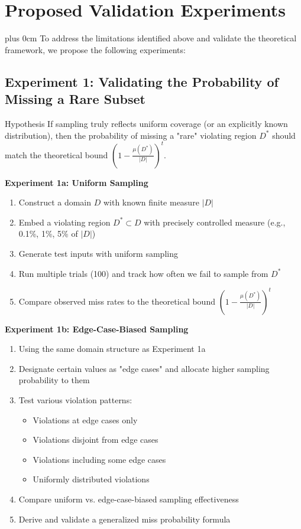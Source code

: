\documentclass[conference]{IEEEtran}
\newcommand{\justifytext}{\leftskip=0pt \rightskip=0pt plus 0cm}
\begin{document}
\section{Proposed Validation Experiments}

\justifytext
To address the limitations identified above and validate the theoretical framework, we propose the following experiments:

\subsection{Experiment 1: Validating the Probability of Missing a Rare Subset}

\begin{theorembox}{Hypothesis}
If sampling truly reflects uniform coverage (or an explicitly known distribution), then the probability of missing a "rare" violating region $D^*$ should match the theoretical bound $\left(1 - \frac{\mu(D^*)}{|D|}\right)^t$.
\end{theorembox}

\begin{tcolorbox}[
  colback=blue!5!white,
  colframe=blue!75!black,
  title=Experimental Design,
  fonttitle=\bfseries
]

\textbf{Experiment 1a: Uniform Sampling}
\begin{enumerate}
\item Construct a domain $D$ with known finite measure $|D|$
\item Embed a violating region $D^* \subset D$ with precisely controlled measure (e.g., 0.1\%, 1\%, 5\% of $|D|$)
\item Generate test inputs with uniform sampling
\item Run multiple trials (100) and track how often we fail to sample from $D^*$
\item Compare observed miss rates to the theoretical bound $\left(1 - \frac{\mu(D^*)}{|D|}\right)^t$
\end{enumerate}

\textbf{Experiment 1b: Edge-Case-Biased Sampling}
\begin{enumerate}
\item Using the same domain structure as Experiment 1a
\item Designate certain values as "edge cases" and allocate higher sampling probability to them
\item Test various violation patterns:
   \begin{itemize}
   \item Violations at edge cases only
   \item Violations disjoint from edge cases
   \item Violations including some edge cases
   \item Uniformly distributed violations
   \end{itemize}
\item Compare uniform vs. edge-case-biased sampling effectiveness
\item Derive and validate a generalized miss probability formula
\end{enumerate}
\end{tcolorbox}
\end{document}
